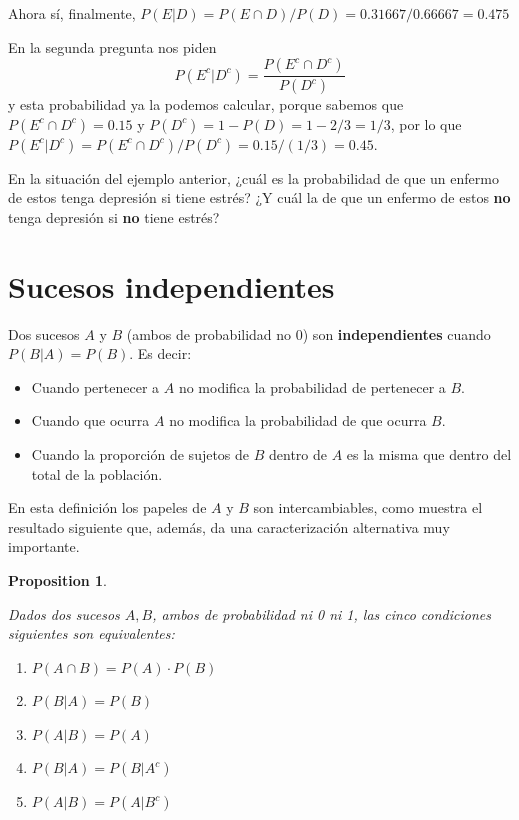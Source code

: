 \documentclass[
]{book}
\providecommand{\tightlist}{%
  \setlength{\itemsep}{0pt}\setlength{\parskip}{0pt}}
\newtheorem{proposition}{Proposition}[chapter]
\theoremstyle{definition}
\theoremstyle{definition}
\theoremstyle{definition}
\theoremstyle{definition}
\theoremstyle{remark}
\begin{document}
Ahora sí, finalmente, \(P(E|D)=P(E\cap D)/P(D)=0.31667/0.66667=0.475\)

En la segunda pregunta nos piden
\[
P(E^c|D^c)=\dfrac{P(E^c\cap D^c)}{P(D^c)}
\]
y esta probabilidad ya la podemos calcular, porque sabemos que \(P(E^c\cap D^c)=0.15\) y \(P(D^c)=1-P(D)=1-2/3=1/3\), por lo que \(P(E^c|D^c)=P(E^c\cap D^c)/P(D^c)=0.15/(1/3)=0.45\).

\begin{rmdexercici}
En la situación del ejemplo anterior, ¿cuál es la probabilidad de que un enfermo de estos tenga depresión si tiene estrés? ¿Y cuál la de que un enfermo de estos \textbf{no} tenga depresión si \textbf{no} tiene estrés?
\end{rmdexercici}

\hypertarget{sucesos-independientes}{%
\section{Sucesos independientes}\label{sucesos-independientes}}

Dos sucesos \(A\) y \(B\) (ambos de probabilidad no 0) son \textbf{independientes} cuando \(P(B|A)=P(B)\). Es decir:

\begin{itemize}
\tightlist
\item
  Cuando pertenecer a \(A\) no modifica la probabilidad de pertenecer a \(B\).
\item
  Cuando que ocurra \(A\) no modifica la probabilidad de que ocurra \(B\).
\item
  Cuando la proporción de sujetos de \(B\) dentro de \(A\) es la misma que dentro del total de la población.
\end{itemize}

En esta definición los papeles de \(A\) y \(B\) son intercambiables, como muestra el resultado siguiente que, además, da una caracterización alternativa muy importante.

\begin{proposition}
\protect\hypertarget{prp:indep}{}\label{prp:indep}

Dados dos sucesos \(A,B\), ambos de probabilidad ni 0 ni 1, las cinco condiciones siguientes son equivalentes:

\begin{enumerate}
\def\labelenumi{\alph{enumi}.}
\tightlist
\item
  \(P(A \cap B)=P(A)\cdot P(B)\)
\item
  \(P(B|A)=P(B)\)
\item
  \(P(A|B)=P(A)\)
\item
  \(P(B|A)=P(B|A^c)\)
\item
  \(P(A|B)=P(A|B^c)\)
\end{enumerate}

\end{proposition}
\end{document}

